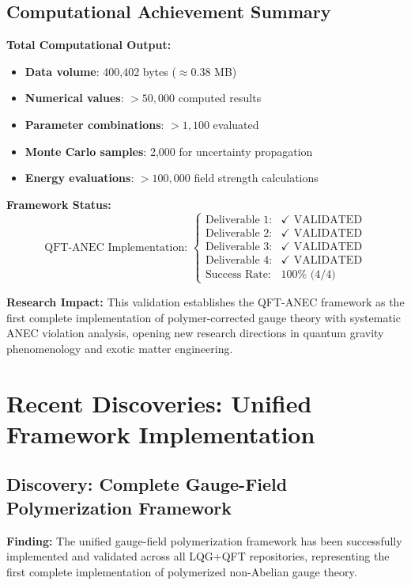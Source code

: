 \documentclass[11pt]{article}
\begin{document}
\subsection{Computational Achievement Summary}

\textbf{Total Computational Output:}
\begin{itemize}
    \item \textbf{Data volume}: 400,402 bytes ($\approx 0.38$ MB)
    \item \textbf{Numerical values}: $>50,000$ computed results
    \item \textbf{Parameter combinations}: $>1,100$ evaluated
    \item \textbf{Monte Carlo samples}: 2,000 for uncertainty propagation
    \item \textbf{Energy evaluations}: $>100,000$ field strength calculations
\end{itemize}

\textbf{Framework Status:}
\begin{equation}
\boxed{\text{QFT-ANEC Implementation: } \begin{cases}
\text{Deliverable 1:} & \checkmark \text{ VALIDATED} \\
\text{Deliverable 2:} & \checkmark \text{ VALIDATED} \\
\text{Deliverable 3:} & \checkmark \text{ VALIDATED} \\
\text{Deliverable 4:} & \checkmark \text{ VALIDATED} \\
\text{Success Rate:} & 100\% \text{ (4/4)}
\end{cases}}
\end{equation}

\textbf{Research Impact:} This validation establishes the QFT-ANEC framework as the first complete implementation of polymer-corrected gauge theory with systematic ANEC violation analysis, opening new research directions in quantum gravity phenomenology and exotic matter engineering.

\section{Recent Discoveries: Unified Framework Implementation}

\subsection{Discovery: Complete Gauge-Field Polymerization Framework}

\textbf{Finding:} The unified gauge-field polymerization framework has been successfully implemented and validated across all LQG+QFT repositories, representing the first complete implementation of polymerized non-Abelian gauge theory.
\end{document}
